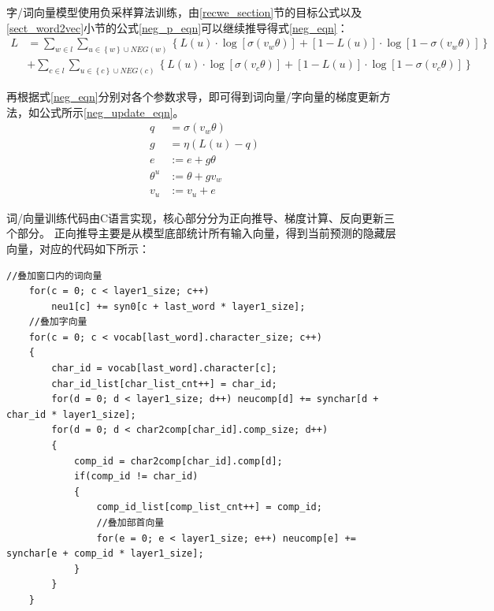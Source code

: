 字/词向量模型使用负采样算法训练，由\ref{recwe_section}节的目标公式以及\ref{sect_word2vec}小节的公式\ref{neg_p_eqn}可以继续推导得式\ref{neg_eqn}：
\begin{equation}
    \begin{aligned}
        L &= \sum_{w\in l}\sum_{u\in \left \{ w \right \}\cup NEG\left ( w \right )}\left \{ L\left ( u \right ) \cdot \log \left [ \sigma \left ( v_w\theta  \right ) \right ]+\left [ 1-  L\left ( u \right )\right ]\cdot \log \left [1- \sigma \left ( v_w\theta  \right ) \right ]\right \} \\
        &+ \sum_{c\in l}\sum_{u\in \left \{ c \right \}\cup NEG\left ( c \right )}\left \{ L\left ( u \right ) \cdot \log \left [ \sigma \left ( v_c\theta  \right ) \right ]+\left [ 1-  L\left ( u \right )\right ]\cdot \log \left [1- \sigma \left ( v_c\theta  \right ) \right ]\right \}
    \end{aligned}
    \label{neg_eqn}
\end{equation}

再根据式\ref{neg_eqn}分别对各个参数求导，即可得到词向量/字向量的梯度更新方法，如公式所示\ref{neg_update_eqn}。
\begin{equation}
    \begin{aligned}
        q&=\sigma \left ( v_w \theta \right )\\
        g&=\eta \left ( L\left ( u \right )-q \right )\\
        e &:=e+g\theta\\
        \theta^u &:=\theta+gv_w\\
        v_u &:=v_u+e
    \end{aligned}
    \label{neg_update_eqn}
\end{equation}

词/向量训练代码由C语言实现，核心部分分为正向推导、梯度计算、反向更新三个部分。
正向推导主要是从模型底部统计所有输入向量，得到当前预测的隐藏层向量，对应的代码如下所示：
\begin{lstlisting}[language={[ANSI]C},frame=shadowbox,rulesepcolor=\color{red!0!green!0!blue!0}] 
    //叠加窗口内的词向量
    for(c = 0; c < layer1_size; c++) 
        neu1[c] += syn0[c + last_word * layer1_size];
    //叠加字向量
    for(c = 0; c < vocab[last_word].character_size; c++)
    {
        char_id = vocab[last_word].character[c];
        char_id_list[char_list_cnt++] = char_id;
        for(d = 0; d < layer1_size; d++) neucomp[d] += synchar[d + char_id * layer1_size];
        for(d = 0; d < char2comp[char_id].comp_size; d++)
        {
            comp_id = char2comp[char_id].comp[d];
            if(comp_id != char_id)
            {
                comp_id_list[comp_list_cnt++] = comp_id;
                //叠加部首向量
                for(e = 0; e < layer1_size; e++) neucomp[e] += synchar[e + comp_id * layer1_size];
            }
        }
    }
\end{lstlisting}

